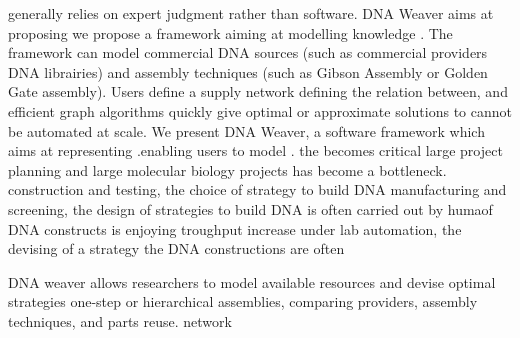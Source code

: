 generally relies on expert judgment rather than software. DNA Weaver aims at proposing we propose a framework aiming at modelling knowledge . The framework can model commercial DNA sources (such as commercial providers DNA librairies) and assembly techniques (such as Gibson Assembly or Golden Gate assembly). Users define a supply network defining the relation between, and efficient graph algorithms quickly give optimal or approximate solutions to  cannot be automated at scale. We present DNA Weaver, a software framework which aims at representing .enabling users to model . the   becomes critical large project planning and large molecular biology projects has become a bottleneck. construction and testing, the choice of strategy to build DNA manufacturing and screening,
  the design of strategies to build DNA is often carried out by humaof DNA constructs is enjoying
  troughput increase under lab automation, the devising of a strategy the DNA constructions are often 
  
 
DNA weaver allows researchers to model available resources and devise optimal strategies one-step or hierarchical assemblies, comparing providers, assembly techniques, and parts reuse. network